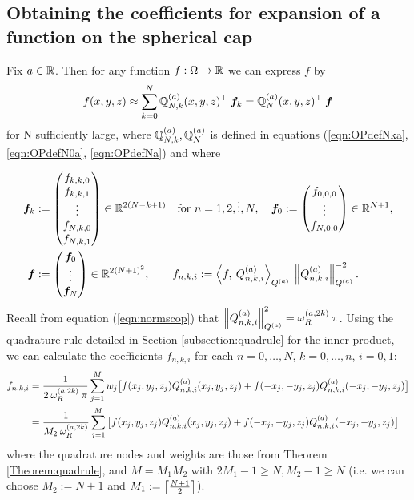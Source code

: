 \documentclass[11pt, oneside]{article}   	%
\begin{document}
\subsection{Obtaining the coefficients for expansion of a function on the spherical cap}\label{subsection:expandingfunctions}

Fix $a \in \mathbb{R}$. Then for any function $f : \Omega \to \mathbb{R}$ we can express $f$ by
\begin{align*}
	f(x,y,z) \approx \sum_{k=0}^N {\mathbb{Q}}^{(a)}_{N,k}(x,y,z)^\top \: \bm{f}_k = {\mathbb{Q}}^{(a)}_{N}(x,y,z)^\top \: \bm{f}
\end{align*}
for N sufficiently large, where ${\mathbb{Q}}^{(a)}_{N,k}, {\mathbb{Q}}^{(a)}_{N}$ is defined in equations (\ref{eqn:OPdefNka}, \ref{eqn:OPdefN0a}, \ref{eqn:OPdefNa}) and where

\begin{align*}
	\bm{f}_k &:= 
		\begin{pmatrix}
			f_{k,k,0} \\
			f_{k,k,1} \\
			\vdots \\
			f_{N,k,0} \\
			f_{N,k,1}
		\end{pmatrix} \in \R^{2(N-k+1)} \quad \text{for } n = 1,2,\dots,N, \quad
	\bm{f}_0 := 
		\begin{pmatrix}
			f_{0,0,0} \\
			\vdots \\
			f_{N,0,0}
		\end{pmatrix} \in \R^{N+1}, \\
	\bm{f} &:= 
		\begin{pmatrix}
			\bm{f}_0 \\
			\vdots \\
			\bm{f}_N
		\end{pmatrix} \in \R^{2(N+1)^2}, \quad \quad
	f_{n,k,i} := \ip< f, \: \scopnkia>_{\scopa} \: \norm{\scopnkia}^{-2}_{\scopa}.
\end{align*}
Recall from equation (\ref{eqn:normscop}) that $\left\| Q_{n,k,i}^{(a)} \right\|^2_{Q^{(a)}} = \omega_R^{(a,2k)} \: \pi$. Using the quadrature rule detailed in Section \ref{subsection:quadrule} for the inner product, we can calculate the coefficients $f_{n,k,i}$ for each $n = 0,\dots,N$, $k = 0,\dots,n$, $i = 0,1$: 
\begin{align*}
	f_{n,k,i} &= \frac{1}{2 \: \omega_R^{(a,2k)} \: \pi} \sum_{j=1}^{M} w_j \big[ f(x_j, y_j, z_j) Q_{n,k,i}^{(a)}(x_j, y_j, z_j) +f(-x_j, -y_j, z_j) Q_{n,k,i}^{(a)}(-x_j, -y_j, z_j) \big] \\
	&= \frac{1}{M_2 \: \omega_R^{(a,2k)}} \sum_{j=1}^{M} \big[ f(x_j, y_j, z_j) Q_{n,k,i}^{(a)}(x_j, y_j, z_j) +f(-x_j, -y_j, z_j) Q_{n,k,i}^{(a)}(-x_j, -y_j, z_j) \big]
\end{align*}
where the quadrature nodes and weights are those from Theorem \ref{Theorem:quadrule}, and $M = M_1 M_2$ with $2M_1 - 1 \ge N, M_2 - 1 \ge N$ (i.e. we can choose $M_2 := N + 1$ and $M_1 := \left\lceil\frac{N+1}{2}\right\rceil$).
\end{document}
